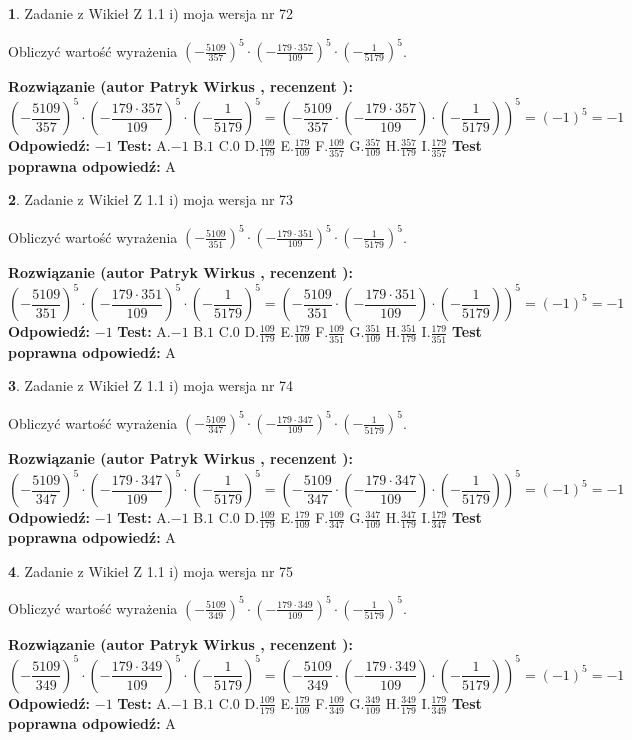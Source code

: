 \documentclass[12pt, a4paper]{article}
\theoremstyle{definition} %
\newtheorem{zad}{}
\newcommand{\zadStart}[1]{\begin{zad}#1\newline}
\newcommand{\zadStop}{\end{zad}}
\newcommand{\rozwStart}[2]{\noindent \textbf{Rozwiązanie (autor #1 , recenzent #2): }\newline}
\newcommand{\rozwStop}{\newline}
\newcommand{\odpStart}{\noindent \textbf{Odpowiedź:}\newline}
\newcommand{\odpStop}{\newline}
\newcommand{\testStart}{\noindent \textbf{Test:}\newline}
\newcommand{\testStop}{\newline}
\newcommand{\kluczStart}{\noindent \textbf{Test poprawna odpowiedź:}\newline}
\newcommand{\kluczStop}{\newline}
\begin{document}
\zadStart{Zadanie z Wikieł Z 1.1 i) moja wersja nr 72}

Obliczyć wartość wyrażenia $(-\frac{5109}{357})^{5} \cdot (-\frac{179 \cdot 357}{109})^{5} \cdot (-\frac{1}{5179})^{5}$.
\zadStop
\rozwStart{Patryk Wirkus}{}
$$(-\frac{5109}{357})^{5} \cdot (-\frac{179 \cdot 357}{109})^{5} \cdot (-\frac{1}{5179})^{5} = (-\frac{5109}{357} \cdot (-\frac{179 \cdot 357}{109}) \cdot (-\frac{1}{5179}))^{5} = (-1)^{5} = -1$$
\rozwStop
\odpStart
$-1$
\odpStop
\testStart
A.$-1$ B.$1$ C.$0$ D.$\frac{109}{179}$ E.$\frac{179}{109}$
F.$\frac{109}{357}$ G.$\frac{357}{109}$
H.$\frac{357}{179}$
I.$\frac{179}{357}$
\testStop
\kluczStart
A
\kluczStop



\zadStart{Zadanie z Wikieł Z 1.1 i) moja wersja nr 73}

Obliczyć wartość wyrażenia $(-\frac{5109}{351})^{5} \cdot (-\frac{179 \cdot 351}{109})^{5} \cdot (-\frac{1}{5179})^{5}$.
\zadStop
\rozwStart{Patryk Wirkus}{}
$$(-\frac{5109}{351})^{5} \cdot (-\frac{179 \cdot 351}{109})^{5} \cdot (-\frac{1}{5179})^{5} = (-\frac{5109}{351} \cdot (-\frac{179 \cdot 351}{109}) \cdot (-\frac{1}{5179}))^{5} = (-1)^{5} = -1$$
\rozwStop
\odpStart
$-1$
\odpStop
\testStart
A.$-1$ B.$1$ C.$0$ D.$\frac{109}{179}$ E.$\frac{179}{109}$
F.$\frac{109}{351}$ G.$\frac{351}{109}$
H.$\frac{351}{179}$
I.$\frac{179}{351}$
\testStop
\kluczStart
A
\kluczStop



\zadStart{Zadanie z Wikieł Z 1.1 i) moja wersja nr 74}

Obliczyć wartość wyrażenia $(-\frac{5109}{347})^{5} \cdot (-\frac{179 \cdot 347}{109})^{5} \cdot (-\frac{1}{5179})^{5}$.
\zadStop
\rozwStart{Patryk Wirkus}{}
$$(-\frac{5109}{347})^{5} \cdot (-\frac{179 \cdot 347}{109})^{5} \cdot (-\frac{1}{5179})^{5} = (-\frac{5109}{347} \cdot (-\frac{179 \cdot 347}{109}) \cdot (-\frac{1}{5179}))^{5} = (-1)^{5} = -1$$
\rozwStop
\odpStart
$-1$
\odpStop
\testStart
A.$-1$ B.$1$ C.$0$ D.$\frac{109}{179}$ E.$\frac{179}{109}$
F.$\frac{109}{347}$ G.$\frac{347}{109}$
H.$\frac{347}{179}$
I.$\frac{179}{347}$
\testStop
\kluczStart
A
\kluczStop



\zadStart{Zadanie z Wikieł Z 1.1 i) moja wersja nr 75}

Obliczyć wartość wyrażenia $(-\frac{5109}{349})^{5} \cdot (-\frac{179 \cdot 349}{109})^{5} \cdot (-\frac{1}{5179})^{5}$.
\zadStop
\rozwStart{Patryk Wirkus}{}
$$(-\frac{5109}{349})^{5} \cdot (-\frac{179 \cdot 349}{109})^{5} \cdot (-\frac{1}{5179})^{5} = (-\frac{5109}{349} \cdot (-\frac{179 \cdot 349}{109}) \cdot (-\frac{1}{5179}))^{5} = (-1)^{5} = -1$$
\rozwStop
\odpStart
$-1$
\odpStop
\testStart
A.$-1$ B.$1$ C.$0$ D.$\frac{109}{179}$ E.$\frac{179}{109}$
F.$\frac{109}{349}$ G.$\frac{349}{109}$
H.$\frac{349}{179}$
I.$\frac{179}{349}$
\testStop
\kluczStart
A
\kluczStop
\end{document}
